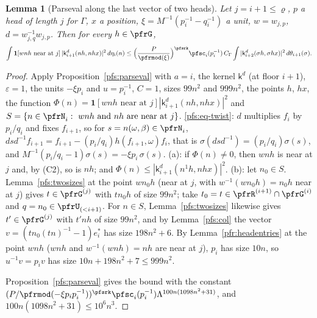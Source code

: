 \documentclass[10pt]{amsart}
\newtheorem{lemma}[theorem]{Lemma}
\theoremstyle{definition}
\theoremstyle{remark}
\begin{document}
\begin{lemma}[Parseval along the last vector of two heads]\label{pfs:secbound}
Let $j=i+1\le\varrho$, $p$ a head of length $j$ for $\Gamma$, $x$ a position, $\xi=M^{-1}(p_i^{-1}-q_i^{-1})$ a unit, $w=w_{j,p}$,
$d=w_{j,q}^{-1}w_{j,p}$. Then for every $h\in\pfrG$,
\[
\int\mathbf 1[wnh\text{ near at }j]\,|\mathsf k^d_{i+1}(nh,nhx)|^2\,d\eta_i(n)\le\Bigl(\frac P{\pfrmod(\xi)}\Bigr)^{\pfsrk}\pfsc_i(p_i^{-1})\,C_\Gamma
\int|\mathsf k^d_{i+2}(\sigma h,\sigma hx)|^2\,d\theta_{i+1}(\sigma).
\]
\end{lemma}
\begin{proof}
Apply Proposition~\ref{pfs:parseval} with $a=i$, the kernel $\mathsf k^d$ (at floor $i+1$), $\varepsilon=1$, the units $-\xi p_i$ and
$u=p_i^{-1}$, $C=1$, sizes $99n^2$ and $999n^2$, the points $h$, $hx$, the function $\Phi(n)=\mathbf 1[wnh\text{ near at }j]|\mathsf k^d_{i+1}(nh,
nhx)|^2$ and $S=\{n\in\pfrN_i:\ wnh\text{ and }nh\text{ are near at }j\}$.
\eqref{pfs:eq-twist}: $d$ multiplies $f_i$ by $p_i/q_i$ and fixes $f_{i+1}$, so for $s=n(\omega,\beta)\in\pfrN_i$,
$dsd^{-1}f_{i+1}=f_{i+1}-(p_i/q_i)h(f_{i+1},\omega)f_i$, that is $\sigma(dsd^{-1})=(p_i/q_i)\sigma(s)$, and
$M^{-1}(p_i/q_i-1)\sigma(s)=-\xi p_i\,\sigma(s)$. (a): if $\Phi(n)\ne0$, then $wnh$ is near at $j$ and, by (C2), so is $nh$; and
$\Phi(n)\le|\mathsf k^d_{i+1}(n^1h,nhx)|^2$. (b): let $n_0\in S$. Lemma~\ref{pfs:twosizes} at the point $wn_0h$ (near at $j$, with
$w^{-1}(wn_0h)=n_0h$ near at $j$) gives $t\in\pfrG^{(j)}$ with $tn_0h$ of size $99n^2$; take $t_0=t\in\pfrR^{(i+1)}\cap\pfrG^{(i)}$ and
$q=n_0\in\pfrU_{(<i+1)}$. For $n\in S$, Lemma~\ref{pfs:twosizes} likewise gives $t'\in\pfrG^{(j)}$ with $t'nh$ of size $99n^2$, and by
Lemma~\ref{pfs:col} the vector $v=(tn_0(tn)^{-1}-1)e_i^*$ has size $198n^2+6$. By Lemma~\ref{pfr:headentries} at the point $wnh$ ($wnh$ and
$w^{-1}(wnh)=nh$ are near at $j$), $p_i$ has size $10n$, so $u^{-1}v=p_iv$ has size $10n+198n^2+7\le999n^2$.

Proposition~\ref{pfs:parseval} gives the bound with the constant $(P/\pfrmod(-\xi p_ip_i^{-1}))^{\pfsrk}\pfsc_i(p_i^{-1})\Lambda^{100n(1098n^2+31)}$,
and $100n(1098n^2+31)\le10^6n^3$.
\end{proof}
\end{document}
